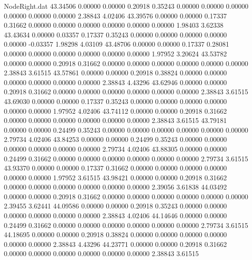 \begin{filecontents}{NodeRight.dat}
  43.34506    0.00000    0.00000     0.20918    0.35243    0.00000    0.00000    0.00000    0.00000    0.00000    0.00000    2.38843    4.02406
  43.39576    0.00000    0.00000     0.17337    0.31662    0.00000    0.00000    0.00000    0.00000    0.00000    0.00000    1.98403    3.62338
  43.43634    0.00000    0.03357     0.17337    0.35243    0.00000    0.00000    0.00000    0.00000    0.00000   -0.03357    1.98298    4.03109
  43.48706    0.00000    0.00000     0.17337    0.28081    0.00000    0.00000    0.00000    0.00000    0.00000    0.00000    1.97952    3.20624
  43.53782    0.00000    0.00000     0.20918    0.31662    0.00000    0.00000    0.00000    0.00000    0.00000    0.00000    2.38843    3.61515
  43.57861    0.00000    0.00000     0.20918    0.38824    0.00000    0.00000    0.00000    0.00000    0.00000    0.00000    2.38843    4.43296
  43.62946    0.00000    0.00000     0.20918    0.31662    0.00000    0.00000    0.00000    0.00000    0.00000    0.00000    2.38843    3.61515
  43.69030    0.00000    0.00000     0.17337    0.35243    0.00000    0.00000    0.00000    0.00000    0.00000    0.00000    1.97952    4.02406
  43.74112    0.00000    0.00000     0.20918    0.31662    0.00000    0.00000    0.00000    0.00000    0.00000    0.00000    2.38843    3.61515
  43.79181    0.00000    0.00000     0.24499    0.35243    0.00000    0.00000    0.00000    0.00000    0.00000    0.00000    2.79734    4.02406
  43.84253    0.00000    0.00000     0.24499    0.35243    0.00000    0.00000    0.00000    0.00000    0.00000    0.00000    2.79734    4.02406
  43.88305    0.00000    0.00000     0.24499    0.31662    0.00000    0.00000    0.00000    0.00000    0.00000    0.00000    2.79734    3.61515
  43.93370    0.00000    0.00000     0.17337    0.31662    0.00000    0.00000    0.00000    0.00000    0.00000    0.00000    1.97952    3.61515
  43.98421    0.00000    0.00000     0.20918    0.31662    0.00000    0.00000    0.00000    0.00000    0.00000    0.00000    2.39056    3.61838
  44.03492    0.00000    0.00000     0.20918    0.31662    0.00000    0.00000    0.00000    0.00000    0.00000    0.00000    2.39455    3.62441
  44.09586    0.00000    0.00000     0.20918    0.35243    0.00000    0.00000    0.00000    0.00000    0.00000    0.00000    2.38843    4.02406
  44.14646    0.00000    0.00000     0.24499    0.31662    0.00000    0.00000    0.00000    0.00000    0.00000    0.00000    2.79734    3.61515
  44.18695    0.00000    0.00000     0.20918    0.38824    0.00000    0.00000    0.00000    0.00000    0.00000    0.00000    2.38843    4.43296
  44.23771    0.00000    0.00000     0.20918    0.31662    0.00000    0.00000    0.00000    0.00000    0.00000    0.00000    2.38843    3.61515

\end{filecontents}
